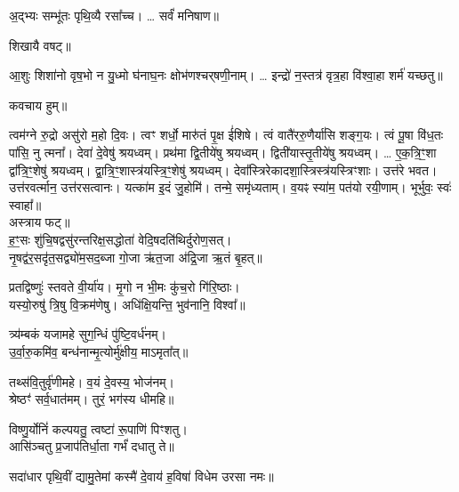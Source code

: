 
अ॒द्भ्यः सम्भू॑तः पृथि॒व्यै रसा᳚च्च। … सर्वं॑ मनिषाण॥

शिखायै वषट्॥

{\small \closesection}

आ॒शुः शिशा॑नो वृष॒भो न यु॒ध्मो घ॑नाघ॒नः क्षोभ॑णश्चर्‌षणी॒नाम्। … इन्द्रो॑ न॒स्तत्र॑ वृत्र॒हा वि॑श्वा॒हा शर्म॑ यच्छतु॥

कवचाय हुम्॥

{\small \closesection}

त्वम॑ग्ने रु॒द्रो असु॑रो म॒हो दि॒वः। त्वꣳ शर्धो॒ मारु॑तं पृ॒क्ष ई॑शिषे।
त्वं वातै॑ररु॒णैर्या॑सि शङ्ग॒यः। त्वं पू॒षा वि॑ध॒तः पा॑सि॒ नु त्मना᳚।
देवा॑ दे॒वेषु॑ श्रयध्वम्। प्रथ॑मा द्वि॒तीये॑षु श्रयध्वम्।
द्विती॑यास्तृ॒तीये॑षु श्रयध्वम्। … ए॒क॒त्रि॒ꣳ॒शा द्वा᳚त्रि॒ꣳ॒शेषु॑ श्रयध्वम्।
द्वा॒त्रि॒ꣳ॒शास्त्र॑यस्त्रि॒ꣳ॒शेषु॑ श्रयध्वम्। देवा᳚स्त्रिरेकादशा॒स्त्रिस्त्र॑यस्त्रिꣳशाः।
उत्त॑रे भवत। उत्त॑रवर्त्मान॒ उत्त॑रसत्वानः।
यत्का॑म इ॒दं जु॒होमि॑। तन्मे॒ समृ॑ध्यताम्।
व॒यꣴ स्या॑म॒ पत॑यो रयी॒णाम्। भूर्भुवः॒ स्वः॑ स्वाहा᳚॥\\
अस्त्राय फट्॥\\


ह॒ꣳ॒सः शु॑चि॒षद्वसु॑रन्तरिक्ष॒सद्धोता॑ वेदि॒षदति॑थिर्दुरोण॒सत्।\\
नृ॒षद्व॑र॒सदृ॑त॒सद्व्यो॑म॒सद॒ब्जा गो॒जा ऋ॑त॒जा अ॑द्रि॒जा ऋ॒तं बृ॒हत्॥

प्रतद्विष्णुः॑ स्तवते वी॒र्या॑य। मृ॒गो न भी॒मः कु॑च॒रो गि॑रि॒ष्ठाः।\\
यस्यो॒रुषु॑ त्रि॒षु वि॒क्रम॑णेषु। अधि॑क्षि॒यन्ति॒ भुव॑नानि॒ विश्वा᳚॥

त्र्य॑म्बकं यजामहे सुग॒न्धिं पु॑ष्टि॒वर्ध॑नम्।\\
उ॒र्वा॒रु॒कमि॑व॒ बन्ध॑नान्मृ॒त्योर्मु॑क्षीय॒ माऽमृता᳚त्॥

तथ्स॑वि॒तुर्वृ॑णीमहे। व॒यं दे॒वस्य॒ भोज॑नम्‌।\\
श्रेष्ठꣳ॑ सर्व॒धात॑मम्‌। तुरं॒ भग॑स्य धीमहि॥

विष्णु॒र्योनिं॑ कल्पयतु॒ त्वष्टा॑ रू॒पाणि॑ पिꣳशतु।\\
आसि॑ञ्चतु प्र॒जाप॑तिर्धा॒ता गर्भं॑ दधातु ते॥

{\small \closesection}

\resetShloka

{सदा॑धार पृथि॒वीं द्यामु॒तेमां कस्मै॑ दे॒वाय॑ ह॒विषा॑ विधेम}
उरसा नमः॥

